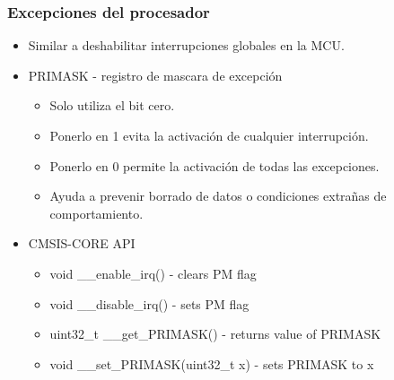 \documentclass[10.5pt,scale=1.0,t,aspectratio=169,hyperref={pdfpagelabels=false}]{beamer}
\begin{document}
\begin{frame}
	\frametitle{Excepciones del procesador}
	\begin{itemize}
		\item Similar a deshabilitar interrupciones globales en la MCU.
		\item PRIMASK - registro de mascara de excepción
		\begin{itemize}
			\item Solo utiliza el bit cero.
			\item Ponerlo en 1 evita la activación de cualquier interrupción.
			\item Ponerlo en 0 permite la activación de todas las excepciones. 
			\item Ayuda a prevenir borrado de datos o condiciones extrañas de comportamiento.
		\end{itemize}
		\item CMSIS-CORE API
		\begin{itemize}
			\item void \_\_enable\_irq() - clears PM flag
			\item void \_\_disable\_irq() - sets PM flag
			\item uint32\_t \_\_get\_PRIMASK() - returns value of PRIMASK
			\item void \_\_set\_PRIMASK(uint32\_t x) - sets PRIMASK to x 
		\end{itemize}
	\end{itemize}
\end{frame}
\end{document}
